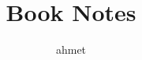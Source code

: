 \documentclass[a4paper,12pt]{report}
\begin{document}
\title{Book Notes}
\author{ahmet}
\maketitle
\tableofcontents
\newpage

%
\end{document}
